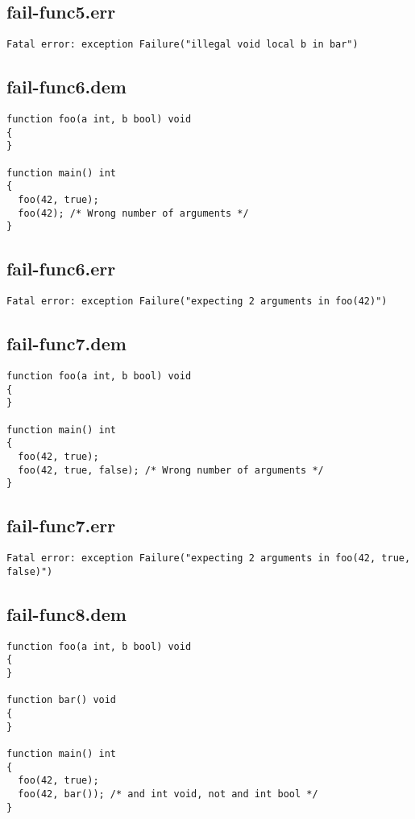 \subsection{fail-func5.err}
\begin{lstlisting}
Fatal error: exception Failure("illegal void local b in bar")
\end{lstlisting}
\subsection{fail-func6.dem}
\begin{lstlisting}
function foo(a int, b bool) void
{
}

function main() int
{
  foo(42, true);
  foo(42); /* Wrong number of arguments */
}
\end{lstlisting}
\subsection{fail-func6.err}
\begin{lstlisting}
Fatal error: exception Failure("expecting 2 arguments in foo(42)")
\end{lstlisting}
\subsection{fail-func7.dem}
\begin{lstlisting}
function foo(a int, b bool) void
{
}

function main() int
{
  foo(42, true);
  foo(42, true, false); /* Wrong number of arguments */
}
\end{lstlisting}
\subsection{fail-func7.err}
\begin{lstlisting}
Fatal error: exception Failure("expecting 2 arguments in foo(42, true, false)")
\end{lstlisting}
\subsection{fail-func8.dem}
\begin{lstlisting}
function foo(a int, b bool) void
{
}

function bar() void
{
}

function main() int
{
  foo(42, true);
  foo(42, bar()); /* and int void, not and int bool */
}
\end{lstlisting}
